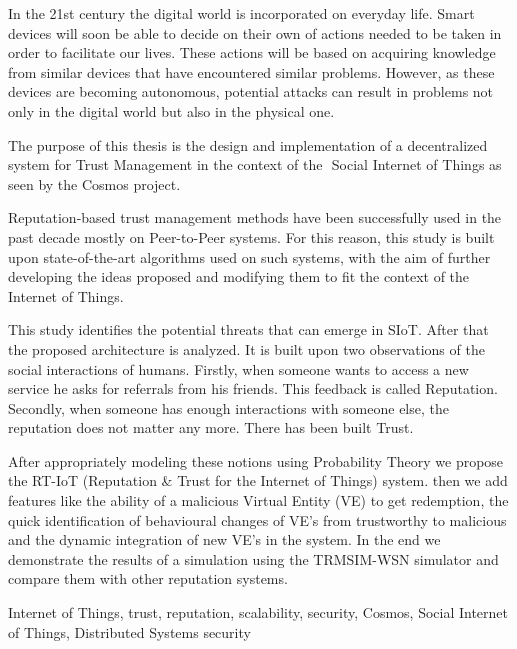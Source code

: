 \begin{abstracten}
In the 21st century the digital world is incorporated on everyday life. Smart devices will soon be able to decide on their own of actions needed to be taken in order to facilitate our lives. 
These actions will be based on acquiring knowledge from similar devices that have encountered similar problems. However, as these devices are becoming autonomous, 
potential attacks can result in problems not only in the digital world but also in the physical one.  
 
The purpose of this thesis is the design and implementation of a decentralized system for Trust Management in the context of the ​
Social Internet of Things​
 as seen by the ​Cosmos​ project. 
 
Reputation-­based trust management methods have been successfully used in the  past 
decade mostly on Peer-­to-­Peer systems. For this reason, this study is built upon 
state-­of-­the-­art algorithms used on such systems, with the aim of further developing the 
ideas proposed and modifying them to fit the context of the Internet of Things. 
 
This study identifies the potential threats that can emerge in SIoT. After that the proposed 
architecture is analyzed. It is built upon two observations of the social interactions of humans.
 Firstly, when someone wants to access a new service he asks for referrals from 
his friends. This feedback is called Reputation. Secondly, when someone has enough 
interactions with someone else, the reputation does not matter any more. There has been built Trust. 
 
After appropriately modeling these notions using Probability Theory we propose the RT-IoT 
(Reputation \& Trust for the Internet of Things) system. then we add features like 
the ability of a malicious Virtual Entity (VE) to get redemption, the quick identification of 
behavioural changes of VE’s from trustworthy to malicious and the dynamic integration of 
new VE’s in the system. In the end we demonstrate the results of a simulation using the TRMSIM-WSN simulator and compare them with other reputation systems. 

	\begin{keywordsen}
    Internet of Things, trust, reputation, scalability, security, Cosmos, Social Internet of Things, Distributed Systems security 
	\end{keywordsen}
\end{abstracten}

